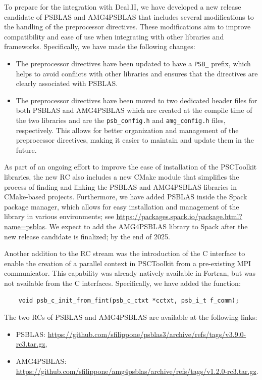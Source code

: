 \documentclass[a4paper,12pt]{article}
\begin{document}
To prepare for the integration with Deal.II, we have developed a new release candidate of PSBLAS and AMG4PSBLAS 
that includes several modifications to the handling of the preprocessor directives. These modifications aim 
to improve compatibility and ease of use when integrating with other libraries and frameworks.
Specifically, we have made the following changes:
\begin{itemize}
    \item The preprocessor directives have been updated to have a \verb|PSB_| prefix, which helps to 
    avoid conflicts with other libraries and ensures that the directives are clearly associated with PSBLAS.
    \item The preprocessor directives have been moved to two dedicated header files for both PSBLAS and AMG4PSBLAS
    which are created at the compile time of the two libraries and are the \verb|psb_config.h| and 
    \verb|amg_config.h| files, respectively. This allows for better organization and management of the 
    preprocessor directives, making it easier to maintain and update them in the future.
\end{itemize}

As part of an ongoing effort to improve the ease of installation of the PSCToolkit libraries, the new RC also 
includes a new CMake module that simplifies the process of finding and linking the PSBLAS and AMG4PSBLAS libraries
in CMake-based projects. Furthermore, we have added PSBLAS inside the Spack package manager, which allows for
easy installation and management of the library in various environments; see \url{https://packages.spack.io/package.html?name=psblas}.
We expect to add the AMG4PSBLAS library to Spack after the new release candidate is finalized; by the end of 2025.

Another addition to the RC stream was the introduction of the C interface to enable the creation of a parallel context 
in PSCToolkit from a pre-existing MPI communicator. This capability was already natively available in Fortran, 
but was not available from the C interfaces. Specifically, we have added the function:
\begin{verbatim}
    void psb_c_init_from_fint(psb_c_ctxt *cctxt, psb_i_t f_comm);
\end{verbatim}

The two RCs of PSBLAS and AMG4PSBLAS are available at the following links:
\begin{itemize}
    \item PSBLAS: \url{https://github.com/sfilippone/psblas3/archive/refs/tags/v3.9.0-rc3.tar.gz},
    \item AMG4PSBLAS: \url{https://github.com/sfilippone/amg4psblas/archive/refs/tags/v1.2.0-rc3.tar.gz}.
\end{itemize}
\end{document}

